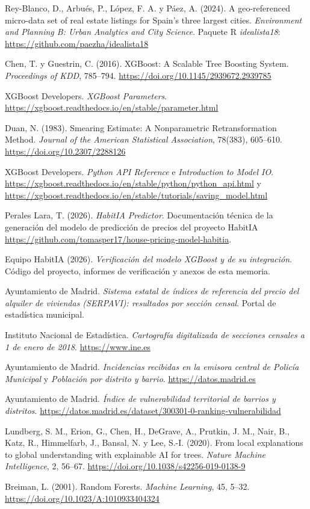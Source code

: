 \documentclass[11pt,a4paper]{article}
\newcounter{anexo}
\begin{document}
\begin{enumerate}[label={[\arabic*]},leftmargin=2.2em,itemsep=6pt]
\item Rey-Blanco, D., Arbués, P., López, F. A. y Páez, A. (2024). A geo-referenced micro-data set of real estate listings for Spain's three largest cities. \emph{Environment and Planning B: Urban Analytics and City Science}. Paquete R \emph{idealista18}: \url{https://github.com/paezha/idealista18}
\item Chen, T. y Guestrin, C. (2016). XGBoost: A Scalable Tree Boosting System. \emph{Proceedings of KDD}, 785--794. \url{https://doi.org/10.1145/2939672.2939785}
\item XGBoost Developers. \emph{XGBoost Parameters}. \url{https://xgboost.readthedocs.io/en/stable/parameter.html}
\item Duan, N. (1983). Smearing Estimate: A Nonparametric Retransformation Method. \emph{Journal of the American Statistical Association}, 78(383), 605--610. \url{https://doi.org/10.2307/2288126}
\item XGBoost Developers. \emph{Python API Reference} e \emph{Introduction to Model IO}. \url{https://xgboost.readthedocs.io/en/stable/python/python_api.html} y \url{https://xgboost.readthedocs.io/en/stable/tutorials/saving_model.html}
\item Perales Lara, T. (2026). \emph{HabitIA Predictor}. Documentación técnica de la generación del modelo de predicción de precios del proyecto HabitIA \url{https://github.com/tomasper17/house-pricing-model-habitia}.
\item Equipo HabitIA (2026). \emph{Verificación del modelo XGBoost y de su integración}. Código del proyecto, informes de verificación y anexos de esta memoria.
\item Ayuntamiento de Madrid. \emph{Sistema estatal de índices de referencia del precio del alquiler de viviendas (SERPAVI): resultados por sección censal}. Portal de estadística municipal.
\item Instituto Nacional de Estadística. \emph{Cartografía digitalizada de secciones censales a 1 de enero de 2018}. \url{https://www.ine.es}
\item Ayuntamiento de Madrid. \emph{Incidencias recibidas en la emisora central de Policía Municipal} y \emph{Población por distrito y barrio}. \url{https://datos.madrid.es}
\item Ayuntamiento de Madrid. \emph{Índice de vulnerabilidad territorial de barrios y distritos}. \url{https://datos.madrid.es/dataset/300301-0-ranking-vulnerabilidad}
\item Lundberg, S. M., Erion, G., Chen, H., DeGrave, A., Prutkin, J. M., Nair, B., Katz, R., Himmelfarb, J., Bansal, N. y Lee, S.-I. (2020). From local explanations to global understanding with explainable AI for trees. \emph{Nature Machine Intelligence}, 2, 56--67. \url{https://doi.org/10.1038/s42256-019-0138-9}
\item Breiman, L. (2001). Random Forests. \emph{Machine Learning}, 45, 5--32. \url{https://doi.org/10.1023/A:1010933404324}
\end{enumerate}
\end{document}
